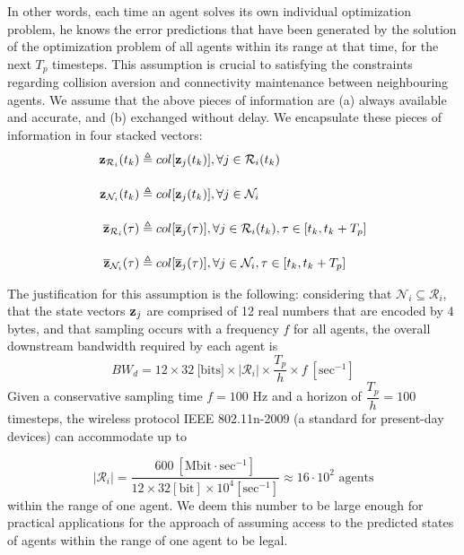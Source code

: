 In other words, each time an agent solves its own individual
optimization problem, he knows the error predictions that have been generated
by the solution of the optimization problem of all agents within
its range at that time, for the next $T_p$ timesteps. This assumption is
crucial to satisfying the constraints regarding collision aversion and
connectivity maintenance between neighbouring agents.
We assume that the above pieces of information are (a) always available and
accurate, and (b) exchanged without delay. We encapsulate these pieces of
information in four stacked vectors:
\begin{subequations}
\begin{align}
  \bm{\mathbf{z}}_{\mathcal{R}_i}(t_k) &\triangleq col[\bm{\mathbf{z}}_j(t_k)], \forall j \in \mathcal{R}_i(t_k) \\[2.5ex]
  \bm{\mathbf{z}}_{\mathcal{N}_i}(t_k) &\triangleq col[\bm{\mathbf{z}}_j(t_k)], \forall j \in \mathcal{N}_i \\[2.5ex]
  \overline{\bm{\mathbf{z}}}_{\mathcal{R}_i}(\tau) &\triangleq col[\overline{\bm{\mathbf{z}}}_j(\tau)], \forall j \in \mathcal{R}_i(t_k), \tau \in [t_k, t_k + T_p] \\[2.5ex]
  \overline{\bm{\mathbf{z}}}_{\mathcal{N}_i}(\tau) &\triangleq col[\overline{\bm{\mathbf{z}}}_j(\tau)], \forall j \in \mathcal{N}_i, \tau \in [t_k, t_k + T_p]
\end{align}
\end{subequations}

\begin{bw_box}
\begin{remark}
The justification for this assumption is the following: considering that
$\mathcal{N}_i \subseteq \mathcal{R}_i$, that the state
vectors $\bm{\mathbf{z}}_j$ are comprised of 12 real numbers that are encoded by
4 bytes, and that sampling occurs with a frequency $f$ for all agents, the
overall downstream bandwidth required by each agent is
$$BW_d = 12 \times 32\ \text{[bits]} \times |\mathcal{R}_i| \times \dfrac{T_p}{h} \times f\ [\text{sec}^{-1}]$$
Given a conservative sampling time $f = 100$ Hz and a horizon of
$\dfrac{T_p}{h} = 100$ timesteps, the wireless protocol IEEE 802.11n-2009
(a standard for present-day devices) can accommodate up to

$$|\mathcal{R}_i| = \dfrac{600\ [\text{Mbit}\cdot \text{sec}^{-1}] }{12\times32[\text{bit}]\times10^4 [\text{sec}^{-1}]} \approx
16 \cdot 10^2 \text{ agents}$$ within the range of one agent.
We deem this number to be large enough for practical applications
for the approach of assuming access to the predicted states of agents
within the range of one agent to be legal.
\end{remark}
\end{bw_box}

